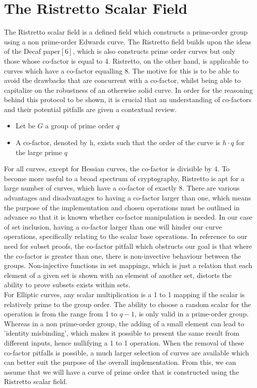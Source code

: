 \documentclass{article}
\begin{document}
\section{The Ristretto Scalar Field}
The Ristretto scalar field is a defined field which constructs a prime-order group using a non prime-order Edwards curve. The Ristretto field builds upon the ideas of the Decaf paper$[6]$, which is also constructs prime order curves but only those whose co-factor is equal to 4. Ristretto, on the other hand, is applicable to curves which have a co-factor equalling 8. The motive for this is to be able to avoid the drawbacks that are concurrent with a co-factor, whilst being able to capitalize on the robustness of an otherwise solid curve. In order for the reasoning behind this protocol to be shown, it is crucial that an understanding of co-factors and their potential pitfalls are given a contextual review. \\
\begin{itemize}
    \item Let be $G$ a group of prime order $q$ 
    \item  A co-factor, denoted by h, exists such that the order of the curve is $h \cdot q$ for the large prime $q$ 
\end{itemize} 
\hfill \break
For all curves, except for Hessian curves, the co-factor is divisible by 4. To become more useful to a broad spectrum of cryptography, Ristretto is apt for a large number of curves, which have a co-factor of exactly 8. There are various advantages and disadvantages to having a co-factor larger than one, which means the purpose of the implementation and chosen operations must be outlined in advance so that it is known whether co-factor manipulation is needed. In our case of set inclusion, having a co-factor larger than one will hinder our curve operations, specifically relating to the scalar base operations. In reference to our need for subset proofs, the co-factor pitfall which obstructs our goal is that where the co-factor is greater than one, there is non-invective behaviour between the groups. Non-injective functions in set mappings, which is just a relation that each element of a given set is shown with an element of another set, distorts the ability to prove subsets exists within sets. \\
For Elliptic curves, any scalar multiplication is a 1 to 1 mapping if the scalar is relatively prime to the group order. The ability to choose a random scalar for the operation is from the range from 1 to $q-1$, is only valid in a prime-order group. Whereas in a non prime-order group, the adding of a small element can lead to 'identity misbinding', which makes it possible to present the same result from different inputs, hence nullifying a 1 to 1 operation. When the removal of these co-factor pitfalls is possible, a much larger selection of curves are available which can better suit the purpose of the overall implementation. From this, we can assume that we will have a curve of prime order that is constructed using the Ristretto scalar field.  \\\\
\end{document}
